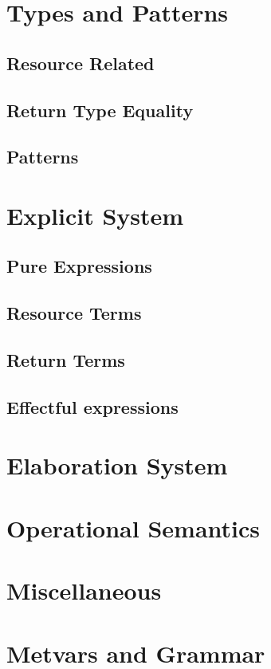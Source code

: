 \documentclass[11pt]{article}%
\begin{document}
\raggedright%

\section{Types and Patterns}

\subsection{Resource Related}
\cndefnsresXXjudge%

\subsection{Return Type Equality}
\cndefnsretXXjudge%

\subsection{Patterns}
\cndefnspatXXjudge%

\section{Explicit System}

\subsection{Pure Expressions}
\cndefnsexplXXpure%

\subsection{Resource Terms}
\cndefnsexplXXres%

\subsection{Return Terms}
\cndefnsexplXXspine%

\subsection{Effectful expressions}
\cndefnsexplXXaction%
\cndefnsexplXXmemop%
\cndefnsexplXXstmt%

\section{Elaboration System}
\cndefnsinfXXres%
\cndefnselabXXaction%
\cndefnselabXXmemop%
\cndefnselabXXspine%
\cndefnselabXXexpr%
\cndefnselab%

\section{Operational Semantics}
\cndefnssubsXXjudge%
\cndefnspureXXopsem%
\cndefnsopsem%

\section{Miscellaneous}
\cndefnsproofXXdefns%
\cndefnsspecXXdefns%
\cndefnsheapXXsat%

\section{Metvars and Grammar}
\cnmetavars\\[\baselineskip]
\cngrammar%
\end{document}
